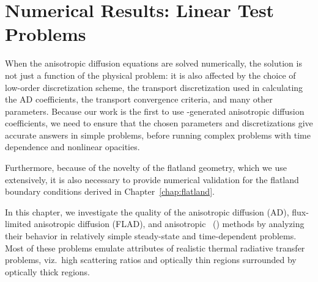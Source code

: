 
\chapter{Numerical Results: Linear Test Problems}\label{chap:simpleNumericalResults}

When the anisotropic diffusion equations are solved numerically, the solution
is not just a function of the physical problem: it is also affected by the
choice
of low-order discretization scheme, the transport discretization used in
calculating the AD coefficients, the transport convergence criteria, and many
other parameters.
Because our work is the first to use \SN-generated anisotropic diffusion
coefficients, we need to ensure that the chosen parameters and
discretizations give accurate answers in simple problems, before running
complex problems with time dependence and nonlinear opacities.

Furthermore, because of the novelty of the
flatland geometry, which we use extensively, it is also necessary to provide
numerical validation for the flatland boundary conditions derived in
Chapter~\ref{chap:flatland}.

In this chapter, we investigate the quality of the
anisotropic diffusion (AD), flux-limited anisotropic diffusion (FLAD), and
anisotropic \Pone\ (\APone) methods by analyzing their behavior in relatively
simple steady-state
and time-dependent problems. Most of these problems emulate attributes of
realistic thermal radiative transfer problems, viz.~high scattering ratios and
optically thin regions surrounded by optically thick regions.

